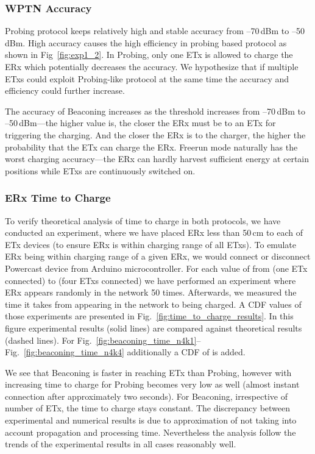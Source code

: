 \documentclass[11pt,draftclsnofoot,journal,onecolumn]{IEEEtran}
\newcommand{\txRssiThreshold}{}
\begin{document}
\subsubsection{WPTN Accuracy}
\label{sec:accuracy_los}

Probing protocol keeps relatively high and stable accuracy from --70\,dBm to --50\,dBm. High accuracy causes the high efficiency in probing based protocol as shown in Fig~\ref{fig:exp1_2}. In Probing, only one ETx is allowed to charge the ERx which potentially decreases the accuracy. We hypothesize that if multiple ETxs could exploit Probing-like protocol at the same time the accuracy and efficiency could further increase.

The accuracy of Beaconing increases as the threshold increases from --70\,dBm to --50\,dBm---the higher \txRssiThreshold value is, the closer the ERx must be to an ETx for triggering the charging. And the closer the ERx is to the charger, the higher the probability that the ETx can charge the ERx. Freerun mode naturally has the worst charging accuracy---the ERx can hardly harvest sufficient energy at certain positions while ETxs are continuously switched on.

\subsubsection{ERx Time to Charge}

To verify theoretical analysis of time to charge in both protocols, we have conducted an experiment, where we have placed ERx less than 50\,cm to each of ETx devices (to ensure ERx is within charging range of all ETxs). To emulate ERx being within charging range of a given ERx, we would connect or disconnect Powercast device from Arduino microcontroller. For each value of  from  (one ETx connected) to  (four ETxs connected) we have performed an experiment where ERx appears randomly in the network 50 times. Afterwards, we measured the time it takes from appearing in the network to being charged. A CDF values of those experiments are presented in Fig.~\ref{fig:time_to_charge_results}. In this figure experimental results (solid lines) are compared against theoretical results (dashed lines). For Fig.~\ref{fig:beaconing_time_n4k1}--Fig.~\ref{fig:beaconing_time_n4k4} additionally a CDF of  is added.

We see that Beaconing is faster in reaching ETx than Probing, however with increasing  time to charge for Probing becomes very low as well (almost instant connection after approximately two seconds). For Beaconing, irrespective of number of ETx, the time to charge stays constant. The discrepancy between experimental and numerical results is due to approximation of not taking into account propagation and processing time. Nevertheless the analysis follow the trends of the experimental results in all cases reasonably well.
\end{document}
